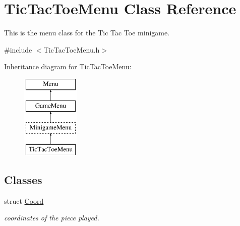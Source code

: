 \hypertarget{classTicTacToeMenu}{\section{Tic\-Tac\-Toe\-Menu Class Reference}
\label{classTicTacToeMenu}
}


This is the menu class for the Tic Tac Toe minigame.  




{\ttfamily \#include $<$Tic\-Tac\-Toe\-Menu.\-h$>$}

Inheritance diagram for Tic\-Tac\-Toe\-Menu\-:\begin{figure}[H]
\begin{center}
\leavevmode
\includegraphics[height=4.000000cm]{classTicTacToeMenu}
\end{center}
\end{figure}
\subsection*{Classes}
\begin{DoxyCompactItemize}
\item 
struct \hyperlink{structTicTacToeMenu_1_1Coord}{Coord}
\begin{DoxyCompactList}\small\item\em coordinates of the piece played. \end{DoxyCompactList}\end{DoxyCompactItemize}
